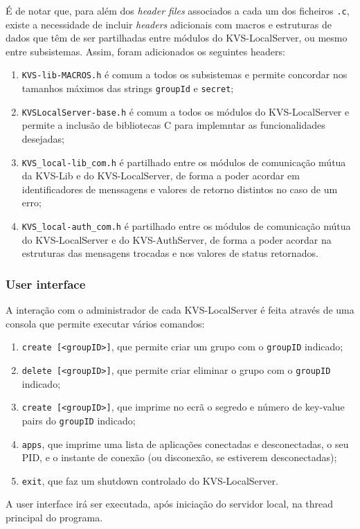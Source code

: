 É de notar que, para além dos \textit{header files} associados a cada um dos ficheiros \texttt{.c}, existe a necessidade de incluir \textit{headers} adicionais com macros e estruturas de dados que têm de ser partilhadas entre módulos do KVS-LocalServer, ou mesmo entre subsistemas. Assim, foram adicionados os seguintes headers:
\begin{enumerate}[noitemsep]
    \item \texttt{KVS-lib-MACROS.h} é comum a todos os subsistemas e permite concordar nos tamanhos máximos das strings \texttt{groupId} e \texttt{secret};
    \item \texttt{KVSLocalServer-base.h} é comum a todos os módulos do KVS-LocalServer e permite a inclusão de bibliotecas C para implemntar as funcionalidades desejadas;
    \item \texttt{KVS\_local-lib\_com.h} é partilhado entre os módulos de comunicação mútua da KVS-Lib e do KVS-LocalServer, de forma a poder acordar em identificadores de menssagens e valores de retorno distintos no caso de um erro;
    \item \texttt{KVS\_local-auth\_com.h} é partilhado entre os módulos de comunicação mútua do KVS-LocalServer e do KVS-AuthServer, de forma a poder acordar na estruturas das mensagens trocadas e nos valores de status retornados.
\end{enumerate}

\subsubsection{User interface}
A interação com o administrador de cada KVS-LocalServer é feita através de uma consola que permite executar vários comandos:
\begin{enumerate}[noitemsep]
    \item \texttt{create [<groupID>]}, que permite criar um grupo com o \texttt{groupID} indicado;
    \item \texttt{delete [<groupID>]}, que permite criar eliminar o grupo com o \texttt{groupID} indicado;
    \item \texttt{create [<groupID>]}, que imprime no ecrã o segredo e número de key-value pairs do \texttt{groupID} indicado;
    \item \texttt{apps}, que imprime uma lista de aplicações conectadas e desconectadas, o seu PID, e o instante de conexão (ou disconexão, se estiverem desconectadas);
    \item \texttt{exit}, que faz um shutdown controlado do KVS-LocalServer.
\end{enumerate}
A user interface irá ser executada, após iniciação do servidor local, na thread principal do programa.

